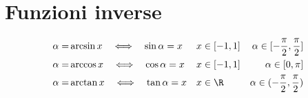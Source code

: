 \section{Funzioni inverse}\label{sec:funzioni-inverse}
\begin{align*}
\alpha=&\arcsin x\quad\Longleftrightarrow\quad\sin\alpha=x&& x\in[-1,1]&\alpha\in[-\dfrac{\pi}{2},\dfrac{\pi}{2}]\\
\alpha=&\arccos x\quad\Longleftrightarrow\quad\cos\alpha=x&&x\in[-1,1]&\alpha\in[0,\pi]\\
\alpha=&\arctan x\quad\Longleftrightarrow\quad\tan\alpha=x&& x\in\R
&\alpha\in(-\dfrac{\pi}{2},\dfrac{\pi}{2})
\end{align*}		